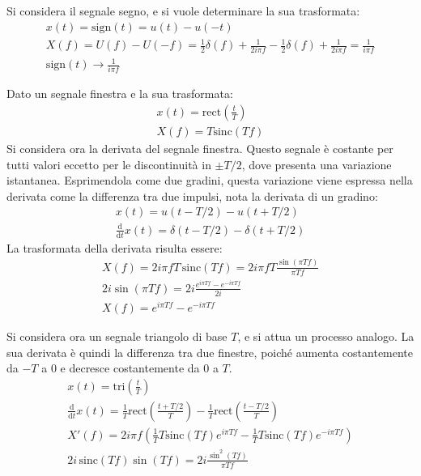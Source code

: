 \documentclass{article}
\newcommand{\rect}{\mathrm{rect}}
\newcommand{\sinc}{\mathrm{sinc}}
\newcommand{\tri}{\mathrm{tri}}
\newcommand{\df}{\mathrm{d}}
\numberwithin{equation}{subsection}
\begin{document}
Si considera il segnale segno, e si vuole determinare la sua trasformata:
\begin{gather*}
    x(t)=\mathrm{sign}(t)=u(t)-u(-t)\\
    X(f)=U(f)-U(-f)=\displaystyle\frac{1}{2}\delta(f)+\frac{1}{2i\pi f}-\frac{1}{2}\delta(f)+\frac{1}{2i\pi f}=\frac{1}{i\pi f}\\
    \mathrm{sign}(t)\to\displaystyle\frac{1}{i\pi f}
\end{gather*}


Dato un segnale finestra e la sua trasformata:
\begin{gather*}
    x(t)=\rect\displaystyle\left(\frac{t}{T}\right)\\
    X(f)=T\sinc\displaystyle\left(Tf\right)
\end{gather*}
Si considera ora la derivata del segnale finestra. Questo segnale è costante per tutti valori eccetto per le discontinuità in $\pm T/2$, dove presenta una variazione istantanea. 
Esprimendola come due gradini, questa variazione viene espressa nella derivata come la differenza tra due impulsi, nota la derivata di un gradino: 
\begin{gather*}
    x(t)=u(t-T/2)-u(t+T/2)\\
    \displaystyle\frac{\df}{\df t}x(t)=\delta(t-T/2)-\delta(t+T/2)
\end{gather*}
La trasformata della derivata risulta essere:
\begin{gather*}
    X(f)=2i\pi fT\,\sinc(Tf)=\displaystyle2i\pi fT\frac{\sin(\pi Tf)}{\pi Tf}\\
    2i\sin(\pi Tf)=2i\frac{e^{i\pi Tf}-e^{-i\pi Tf}}{2i}\\
    X(f)=e^{i\pi Tf}-e^{-i\pi Tf}
\end{gather*}


Si considera ora un segnale triangolo di base $T$, e si attua un processo analogo. La sua derivata è quindi la differenza tra due finestre, poiché aumenta costantemente da 
$-T$ a $0$ e decresce costantemente da $0$ a $T$. 
\begin{gather*}
    x(t)=\tri \displaystyle\left(\frac{t}{T}\right)\\
    \displaystyle\frac{\df}{\df t}x(t)=\frac{1}{T}\rect\left(\frac{t+T/2}{T}\right)-\frac{1}{T}\rect\left(\frac{t-T/2}{T}\right)\\
    X'(f)=2i\pi f\displaystyle\left(\frac{1}{T}T\sinc(Tf)e^{i\pi Tf}-\frac{1}{T}T\sinc(Tf)e^{-i\pi Tf}\right)\\
    2i\,\sinc(Tf)\sin(Tf)=\displaystyle2i\frac{\sin^2(Tf)}{\pi Tf}
\end{gather*}
\end{document}
